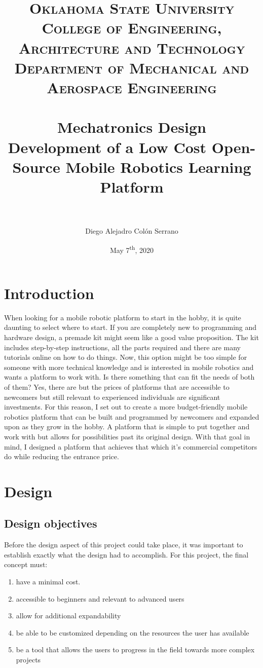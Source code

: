 \documentclass[12pt, letterpaper,titlepage]{article}
\title{	
\normalfont \normalsize 
\textsc{Oklahoma State University} \\ [25pt] 
\textsc{College of Engineering, Architecture and Technology} \\ [25pt]
\textsc{Department of Mechanical and Aerospace Engineering} \\ [25pt]
\horrule{0.5pt} \\[0.4cm] %
\huge  Mechatronics Design \\ 
\huge  Development of a Low Cost Open-Source Mobile Robotics Learning Platform\\
\horrule{0.5pt} \\[0.5cm] %
}
\author{Diego Alejadro Colón Serrano}
\date{May 7\textsuperscript{th}, 2020}
\begin{document}
\maketitle
\tableofcontents
\pagebreak

\section{Introduction}

	When looking for a mobile robotic platform to start in the hobby, it is quite daunting to select where to start. If you are completely new to programming and hardware design, a premade kit might seem like a good value proposition. The kit includes step-by-step instructions, all the parts required and there are many tutorials online on how to do things. Now, this option might be too simple for someone with more technical knowledge and is interested in mobile robotics and wants a platform to work with. Is there something that can fit the needs of both of them? Yes, there are but the prices of platforms that are accessible to newcomers but still relevant to experienced individuals are significant investments. For this reason, I set out to create a more budget-friendly mobile robotics platform that can be built and programmed by newcomers and expanded upon as they grow in the hobby. A platform that is simple to put together and work with but allows for possibilities past its original design. With that goal in mind, I designed a platform that achieves that which it's commercial competitors do while reducing the entrance price. \cite{DUMMY:1}

\section{Design}

\subsection{Design objectives}

	Before the design aspect of this project could take place, it was important to establish exactly what the design had to accomplish. For this project, the final concept must:

	\begin{enumerate}
		\item have a minimal cost.
		\item accessible to beginners and relevant to advanced users
		\item allow for additional expandability
		\item be able to be customized depending on the resources the user has available
		\item be a tool that allows the users to progress in the field towards more complex projects
	\end{enumerate}
\end{document}
